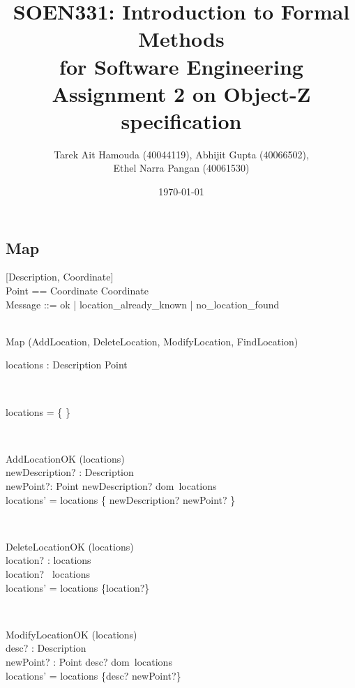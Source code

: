 \documentclass[12pt]{article}
\title{SOEN331: Introduction to Formal Methods\\for Software Engineering\\
Assignment 2 on Object-Z specification}
\author{Tarek Ait Hamouda (40044119), Abhijit Gupta (40066502),\\ 
Ethel Narra Pangan (40061530)}
\date{\today}
\begin{document}
\begin{spacing}{1.5}

\maketitle

\newpage

\section{Map}
[Description, Coordinate] \\
Point == Coordinate \times Coordinate \\
Message ::= ok | location\_already\_known | no\_location\_found \\
\\
\begin{class}{Map}
\also
\uparrow (AddLocation, DeleteLocation, ModifyLocation, FindLocation)
\begin{state}
locations : Description \pfun Point\\
\end{state} \\
\begin{init}
locations = \{ \}
\end{init} \\
\begin{op}{AddLocationOK}
\Delta (locations) \\
newDescription? : Description\\
newPoint?: Point 
\ST
newDescription? \notin dom~locations \\
locations' = locations \cup \{ newDescription? \to newPoint? \}
\end{op}\\
\begin{op}{DeleteLocationOK}
\Delta (locations) \\
location? : locations\\
\ST
location? \in ~locations\\
locations' = locations \setminus \{location?\}
\end{op}\\
\begin{op}{ModifyLocationOK}
\Delta (locations) \\
desc? : Description\\
newPoint? : Point
\ST
desc? \in dom~locations \\
locations' = locations \oplus \{desc? \to newPoint?\}
\end{op}\\ 

\end{class}
\end{spacing}
\end{document}
